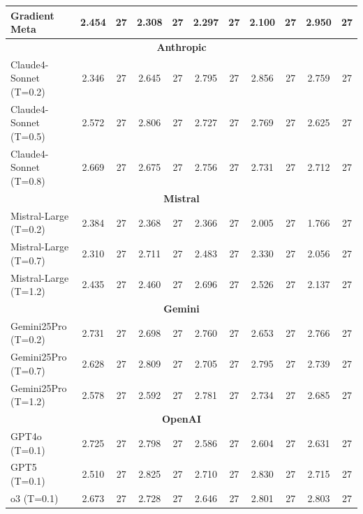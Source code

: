 \begin{table}
\begin{tabular}{|l|cc|cc|cc|cc|cc|}
Gradient Meta & 2.454 & 27 & 2.308 & 27 & 2.297 & 27 & 2.100 & 27 & 2.950 & 27 \\
\hline
\multicolumn{11}{|c|}{\textbf{Anthropic}} \\
\hline
Claude4-Sonnet (T=0.2) & 2.346 & 27 & 2.645 & 27 & 2.795 & 27 & 2.856 & 27 & 2.759 & 27 \\
Claude4-Sonnet (T=0.5) & 2.572 & 27 & 2.806 & 27 & 2.727 & 27 & 2.769 & 27 & 2.625 & 27 \\
Claude4-Sonnet (T=0.8) & 2.669 & 27 & 2.675 & 27 & 2.756 & 27 & 2.731 & 27 & 2.712 & 27 \\
\hline
\multicolumn{11}{|c|}{\textbf{Mistral}} \\
\hline
Mistral-Large (T=0.2) & 2.384 & 27 & 2.368 & 27 & 2.366 & 27 & 2.005 & 27 & 1.766 & 27 \\
Mistral-Large (T=0.7) & 2.310 & 27 & 2.711 & 27 & 2.483 & 27 & 2.330 & 27 & 2.056 & 27 \\
Mistral-Large (T=1.2) & 2.435 & 27 & 2.460 & 27 & 2.696 & 27 & 2.526 & 27 & 2.137 & 27 \\
\hline
\multicolumn{11}{|c|}{\textbf{Gemini}} \\
\hline
Gemini25Pro (T=0.2) & 2.731 & 27 & 2.698 & 27 & 2.760 & 27 & 2.653 & 27 & 2.766 & 27 \\
Gemini25Pro (T=0.7) & 2.628 & 27 & 2.809 & 27 & 2.705 & 27 & 2.795 & 27 & 2.739 & 27 \\
Gemini25Pro (T=1.2) & 2.578 & 27 & 2.592 & 27 & 2.781 & 27 & 2.734 & 27 & 2.685 & 27 \\
\hline
\multicolumn{11}{|c|}{\textbf{OpenAI}} \\
\hline
GPT4o (T=0.1) & 2.725 & 27 & 2.798 & 27 & 2.586 & 27 & 2.604 & 27 & 2.631 & 27 \\
GPT5 (T=0.1) & 2.510 & 27 & 2.825 & 27 & 2.710 & 27 & 2.830 & 27 & 2.715 & 27 \\
o3 (T=0.1) & 2.673 & 27 & 2.728 & 27 & 2.646 & 27 & 2.801 & 27 & 2.803 & 27 \\
\hline
\end{tabular}
\end{table}

\clearpage
